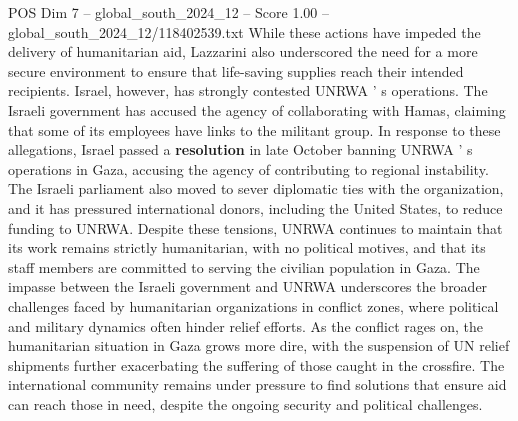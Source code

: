 \begin{textsample}{POS Dim 7 – global\_south\_2024\_12 – Score 1.00 – global\_south\_2024\_12/118402539.txt}
While these actions have impeded the delivery of humanitarian aid, Lazzarini also underscored the need for a more secure environment to ensure that life-saving supplies reach their intended recipients.
Israel, however, has strongly contested UNRWA ' s operations.
The Israeli government has accused the agency of collaborating with Hamas, claiming that some of its employees have links to the militant group.
In response to these allegations, Israel passed a \textbf{resolution} in late October banning UNRWA ' s operations in Gaza, accusing the agency of contributing to regional instability.
The Israeli parliament also moved to sever diplomatic ties with the organization, and it has pressured international donors, including the United States, to reduce funding to UNRWA.
Despite these tensions, UNRWA continues to maintain that its work remains strictly humanitarian, with no political motives, and that its staff members are committed to serving the civilian population in Gaza.
The impasse between the Israeli government and UNRWA underscores the broader challenges faced by humanitarian organizations in conflict zones, where political and military dynamics often hinder relief efforts.
As the conflict rages on, the humanitarian situation in Gaza grows more dire, with the suspension of UN relief shipments further exacerbating the suffering of those caught in the crossfire.
The international community remains under pressure to find solutions that ensure aid can reach those in need, despite the ongoing security and political challenges.

\end{textsample}
